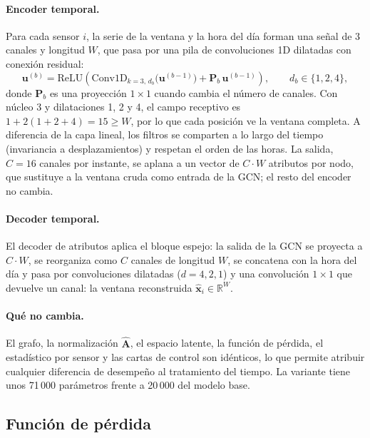 \documentclass[11pt,a4paper]{article}
\newcommand{\R}{\mathbb{R}}
\newcommand{\Ahat}{\hat{\mathbf{A}}}
\begin{document}
\paragraph{Encoder temporal.} Para cada sensor $i$, la serie de la ventana y la hora
del día forman una señal de 3 canales y longitud $W$, que pasa por una pila de
convoluciones 1D dilatadas con conexión residual:
\begin{equation}
\mathbf{u}^{(b)} = \mathrm{ReLU}\!\left(\mathrm{Conv1D}_{k=3,\,d_b}\big(\mathbf{u}^{(b-1)}\big)
+ \mathbf{P}_b\,\mathbf{u}^{(b-1)}\right),\qquad d_b\in\{1,2,4\},
\end{equation}
donde $\mathbf{P}_b$ es una proyección $1\times1$ cuando cambia el número de canales.
Con núcleo 3 y dilataciones 1, 2 y 4, el campo receptivo es
$1+2(1+2+4)=15\ge W$, por lo que cada posición ve la ventana completa. A diferencia de
la capa lineal, los filtros se comparten a lo largo del tiempo (invariancia a
desplazamientos) y respetan el orden de las horas. La salida, $C=16$ canales por
instante, se aplana a un vector de $C\cdot W$ atributos por nodo, que sustituye a la
ventana cruda como entrada de la GCN; el resto del encoder no cambia.

\paragraph{Decoder temporal.} El decoder de atributos aplica el bloque espejo: la
salida de la GCN se proyecta a $C\cdot W$, se reorganiza como $C$ canales de longitud
$W$, se concatena con la hora del día y pasa por convoluciones dilatadas
($d=4,2,1$) y una convolución $1\times1$ que devuelve un canal: la ventana
reconstruida $\hat{\mathbf{x}}_i\in\R^{W}$.

\paragraph{Qué no cambia.} El grafo, la normalización $\Ahat$, el espacio latente, la
función de pérdida, el estadístico por sensor y las cartas de control son idénticos,
lo que permite atribuir cualquier diferencia de desempeño al tratamiento del tiempo.
La variante tiene unos 71\,000 parámetros frente a 20\,000 del modelo base.

\subsection{Función de pérdida}
\end{document}
